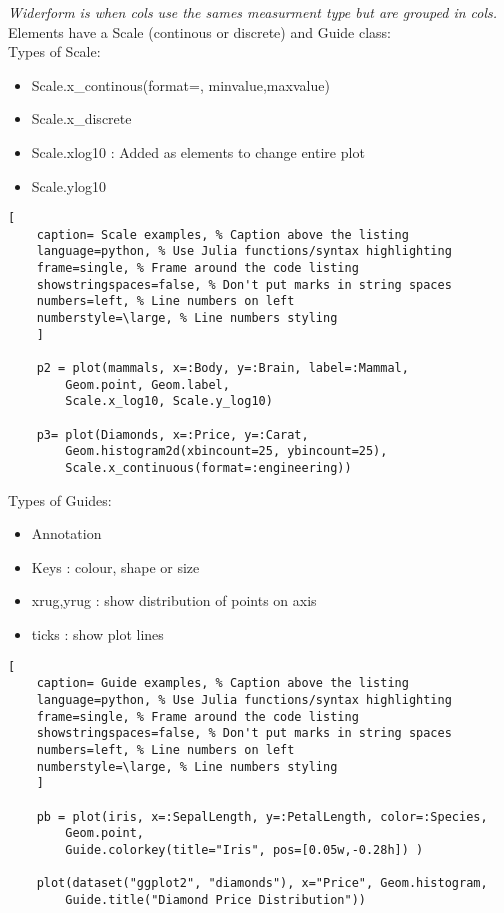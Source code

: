 \documentclass[11pt]{scrartcl} %
\begin{document}
\textit{Widerform is when cols use the sames measurment type but are grouped in cols.}\\

Elements have a Scale (continous or discrete) and Guide class:\\

Types of Scale:
\begin{itemize}
	\item Scale.x\_continous(format=, minvalue,maxvalue)
	\item Scale.x\_discrete
	\item Scale.xlog10 : Added as elements to change entire plot
	\item Scale.ylog10
\end{itemize}

\begin{lstlisting}[
	caption= Scale examples, % Caption above the listing
	language=python, % Use Julia functions/syntax highlighting
	frame=single, % Frame around the code listing
	showstringspaces=false, % Don't put marks in string spaces
	numbers=left, % Line numbers on left
	numberstyle=\large, % Line numbers styling
	]

	p2 = plot(mammals, x=:Body, y=:Brain, label=:Mammal, 
		Geom.point, Geom.label,
		Scale.x_log10, Scale.y_log10)

	p3= plot(Diamonds, x=:Price, y=:Carat, 
		Geom.histogram2d(xbincount=25, ybincount=25),
    	Scale.x_continuous(format=:engineering))

\end{lstlisting}

Types of Guides:
\begin{itemize}
	\item Annotation
	\item Keys : colour, shape or size
	\item xrug,yrug : show distribution of points on axis
	\item ticks : show plot lines
\end{itemize}

\begin{lstlisting}[
	caption= Guide examples, % Caption above the listing
	language=python, % Use Julia functions/syntax highlighting
	frame=single, % Frame around the code listing
	showstringspaces=false, % Don't put marks in string spaces
	numbers=left, % Line numbers on left
	numberstyle=\large, % Line numbers styling
	]

	pb = plot(iris, x=:SepalLength, y=:PetalLength, color=:Species, 
		Geom.point,
        Guide.colorkey(title="Iris", pos=[0.05w,-0.28h]) )

	plot(dataset("ggplot2", "diamonds"), x="Price", Geom.histogram,
		Guide.title("Diamond Price Distribution"))

\end{lstlisting}
\end{document}
